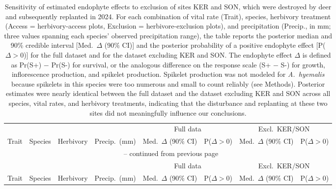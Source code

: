 \begin{landscape}
\setlength{\tabcolsep}{4pt}
\begin{longtable}{llllcccc}
\caption{Sensitivity of estimated endophyte effects to exclusion of sites KER and SON, which were destroyed by deer and subsequently replanted in 2024. For each combination of vital rate (Trait), species, herbivory treatment (Access = herbivory-access plots, Exclusion = herbivore-exclusion plots), and precipitation (Precip., in mm; three values spanning each species' observed precipitation range), the table reports the posterior median and 90\% credible interval [Med.\ $\Delta$ (90\% CI)] and the posterior probability of a positive endophyte effect [P($\Delta>0$)] for the full dataset and for the dataset excluding KER and SON. The endophyte effect $\Delta$ is defined as Pr(S+) $-$ Pr(S-) for survival, or the analogous difference on the response scale (S+ $-$ S-) for growth, inflorescence production, and spikelet production. Spikelet production was not modeled for \textit{A.\ hyemalis} because spikelets in this species were too numerous and small to count reliably (see Methods). Posterior estimates were nearly identical between the full dataset and the dataset excluding KER and SON across all species, vital rates, and herbivory treatments, indicating that the disturbance and replanting at these two sites did not meaningfully influence our conclusions.} \label{tab:sensitivity_KER_SON} \\
\toprule
& & & & \multicolumn{2}{c}{Full data} & \multicolumn{2}{c}{Excl.\ KER/SON} \\
\cmidrule(lr){5-6} \cmidrule(lr){7-8}
Trait & Species & Herbivory & Precip.\ (mm) & Med.\ $\Delta$ (90\% CI) & P($\Delta{>}0$) & Med.\ $\Delta$ (90\% CI) & P($\Delta{>}0$) \\
\midrule
\endfirsthead

\multicolumn{8}{c}{{\tablename\ \thetable{} -- continued from previous page}} \\
\toprule
& & & & \multicolumn{2}{c}{Full data} & \multicolumn{2}{c}{Excl.\ KER/SON} \\
\cmidrule(lr){5-6} \cmidrule(lr){7-8}
Trait & Species & Herbivory & Precip.\ (mm) & Med.\ $\Delta$ (90\% CI) & P($\Delta{>}0$) & Med.\ $\Delta$ (90\% CI) & P($\Delta{>}0$) \\
\midrule
\endhead


\end{longtable}
\end{landscape}
